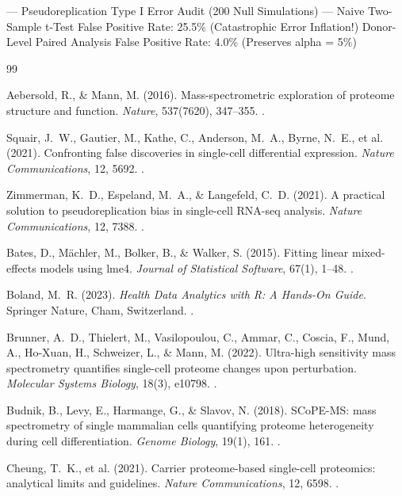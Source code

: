 \documentclass[11pt,twoside,openright]{book}
\begin{document}
\begin{routput}
--- Pseudoreplication Type I Error Audit (200 Null Simulations) ---
Naive Two-Sample t-Test False Positive Rate: 25.5\% (Catastrophic Error Inflation!)
Donor-Level Paired Analysis False Positive Rate: 4.0\% (Preserves alpha = 5\%)
\end{routput}

\begin{thebibliography}{99}

Aebersold, R., \& Mann, M. (2016). Mass-spectrometric exploration of proteome structure and function. \textit{Nature}, 537(7620), 347--355. .

Squair, J.~W., Gautier, M., Kathe, C., Anderson, M.~A., Byrne, N.~E., et al. (2021). Confronting false discoveries in single-cell differential expression. \textit{Nature Communications}, 12, 5692. .

Zimmerman, K.~D., Espeland, M.~A., \& Langefeld, C.~D. (2021). A practical solution to pseudoreplication bias in single-cell RNA-seq analysis. \textit{Nature Communications}, 12, 7388. .

Bates, D., M\"achler, M., Bolker, B., \& Walker, S. (2015). Fitting linear mixed-effects models using lme4. \textit{Journal of Statistical Software}, 67(1), 1--48. .

Boland, M.~R. (2023). \textit{Health Data Analytics with R: A Hands-On Guide}. Springer Nature, Cham, Switzerland. .

Brunner, A.~D., Thielert, M., Vasilopoulou, C., Ammar, C., Coscia, F., Mund, A., Ho-Xuan, H., Schweizer, L., \& Mann, M. (2022). Ultra-high sensitivity mass spectrometry quantifies single-cell proteome changes upon perturbation. \textit{Molecular Systems Biology}, 18(3), e10798. .

Budnik, B., Levy, E., Harmange, G., \& Slavov, N. (2018). SCoPE-MS: mass spectrometry of single mammalian cells quantifying proteome heterogeneity during cell differentiation. \textit{Genome Biology}, 19(1), 161. .

Cheung, T.~K., et al. (2021). Carrier proteome-based single-cell proteomics: analytical limits and guidelines. \textit{Nature Communications}, 12, 6598. .


\end{thebibliography}
\end{document}
